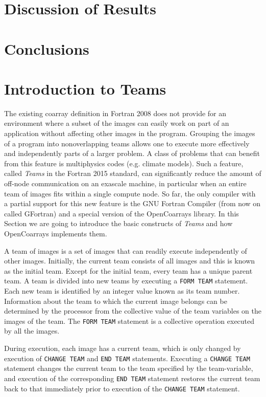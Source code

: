 \section{Discussion of Results}

\section{Conclusions}

\section{Introduction to Teams}\label{sec:teams}
The existing coarray definition in Fortran 2008 does not provide for an environment
where a subset of the images can easily work on part of an application without affecting
other images in the program.  Grouping the images of a program into nonoverlapping
teams allows one to execute more effectively and independently parts of a larger
problem.  A class of problems that can benefit from this feature is multiphysics codes
(e.g.  climate models).
Such a feature, called \textit{Teams} in the Fortran 2015 standard, can significantly reduce the amount of off-node
communication on an exascale machine, in particular when an entire team of images
fits within a single compute node.
So far, the only compiler with a partial support for this new feature is the GNU Fortran Compiler (from now on
called GFortran) and a special version of the OpenCoarrays library.
In this Section we are going to introduce the basic constructs of \textit{Teams} and how OpenCoarrays implements them.

A team of images is a set of images that can readily execute independently of other images.
Initially, the current team consists of all images and this is
known as the initial team. Except for the initial team, every team has a unique parent team. A team is divided
into new teams by executing a \texttt{FORM TEAM} statement.
Each new team is identified by an integer value known
as its team number. Information about the team to which the current image belongs can be determined by the
processor from the collective value of the team variables on the images of the team.
The \texttt{FORM TEAM} statement is a collective operation executed by all the images.

During execution, each image has a current team, which is only changed by execution of \texttt{CHANGE TEAM} and
\texttt{END TEAM} statements. Executing a \texttt{CHANGE TEAM} statement changes the current team to the team specified
by the team-variable, and execution of the corresponding \texttt{END TEAM} statement restores the current team back
to that immediately prior to execution of the \texttt{CHANGE TEAM} statement.

